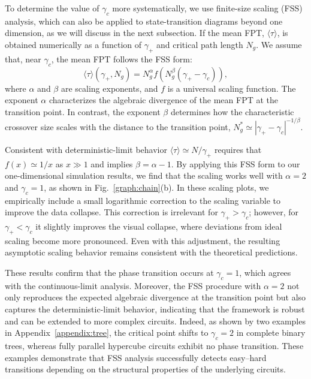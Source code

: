 \documentclass[%
 reprint,
superscriptaddress,
 amsmath,amssymb,
 aps,
 prx,
]{revtex4-2}
\begin{document}
To determine the value of $\gamma_c$ more systematically, we use finite-size scaling (FSS) analysis, which can also be applied to state-transition diagrams beyond one dimension, as we will discuss in the next subsection. If the mean FPT, $\langle\tau\rangle$, is obtained numerically as a function of $\gamma_+$ and critical path length $N_g$. We assume that, near $\gamma_c$, the mean FPT follows the FSS form: 
\begin{equation}
    \label{eqn:FSS}
    \langle\tau\rangle(\gamma_+,N_g) = N_g^\alpha f\left(N_g^\beta(\gamma_+-\gamma_c)\right), 
\end{equation}
where $\alpha$ and $\beta$ are scaling exponents, and $f$ is a universal scaling function. The exponent $\alpha$ characterizes the algebraic divergence of the mean FPT at the transition point. In contrast, the exponent $\beta$ determines how the characteristic crossover size scales with the distance to the transition point, $N_g^*\simeq |\gamma_+-\gamma_c|^{-1/\beta}$. 

Consistent with deterministic-limit behavior $\langle\tau\rangle\simeq N/\gamma_+$ requires that $f(x)\simeq 1/x$ as $x\gg 1$ and implies $\beta=\alpha-1$.  
By applying this FSS form to our one-dimensional simulation results, we find that the scaling works well with $\alpha=2$ and $\gamma_c=1$, as shown in Fig.~\ref{graph:chain}(b). In these scaling plots, we empirically include a small logarithmic correction to the scaling variable to improve the data collapse. This correction is irrelevant for $\gamma_+>\gamma_c$; however, for $\gamma_+<\gamma_c$ it slightly improves the visual collapse, where deviations from ideal scaling become more pronounced. Even with this adjustment, the resulting asymptotic scaling behavior remains consistent with the theoretical predictions. 

These results confirm that the phase transition occurs at $\gamma_c=1$, which agrees with the continuous-limit analysis. Moreover, the FSS procedure with $\alpha=2$ not only reproduces the expected algebraic divergence at the transition point but also captures the deterministic-limit behavior, indicating that the framework is robust and can be extended to more complex circuits. Indeed, as shown by two examples in Appendix~\ref{appendix:tree}, the critical point shifts to $\gamma_c=2$ in complete binary trees, whereas fully parallel hypercube circuits exhibit no phase transition. These examples demonstrate that FSS analysis successfully detects easy--hard transitions depending on the structural properties of the underlying circuits.   
\end{document}
